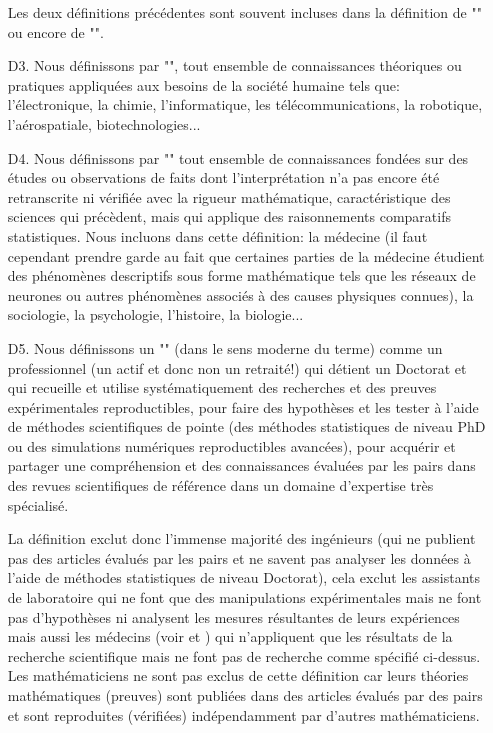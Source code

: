 \begin{itemize}
		\begin{tcolorbox}[title=Remarque,colframe=black,arc=10pt]
		Les deux d\'efinitions pr\'ec\'edentes sont souvent incluses dans la d\'efinition de "" ou encore de "".
		\end{tcolorbox}
		
		\item[D3.] Nous d\'efinissons par "", tout ensemble de connaissances th\'eoriques ou pratiques appliqu\'ees aux besoins de la soci\'et\'e humaine tels que: l'\'electronique, la chimie, l'informatique, les t\'el\'ecommunications, la robotique, l'a\'erospatiale, biotechnologies...
	
		\item[D4.] Nous d\'efinissons par "" tout ensemble de connaissances fond\'ees sur des \'etudes ou observations de faits dont l'interpr\'etation n'a pas encore \'et\'e retranscrite ni v\'erifi\'ee avec la rigueur math\'ematique, caract\'eristique des sciences qui pr\'ecèdent, mais qui applique des raisonnements comparatifs statistiques. Nous incluons dans cette d\'efinition: la m\'edecine (il faut cependant prendre garde au fait que certaines parties de la m\'edecine \'etudient des ph\'enomènes descriptifs sous forme math\'ematique tels que les r\'eseaux de neurones ou autres ph\'enomènes associ\'es à des causes physiques connues), la sociologie, la psychologie, l'histoire, la biologie...
		
		\item[D5.] Nous définissons un "" (dans le sens moderne du terme) comme un professionnel (un actif et donc non un retraité!) qui détient un Doctorat et qui recueille et utilise systématiquement des recherches et des preuves expérimentales reproductibles, pour faire des hypothèses et les tester à l'aide de méthodes scientifiques de pointe (des méthodes statistiques de niveau PhD ou des simulations numériques reproductibles avancées), pour acquérir et partager une compréhension et des connaissances évaluées par les pairs dans des revues scientifiques de référence dans un domaine d'expertise très spécialisé.

		La définition exclut donc l'immense majorité des ingénieurs (qui ne publient pas des articles évalués par les pairs et ne savent pas analyser les données à l'aide de méthodes statistiques de niveau Doctorat), cela exclut les assistants de laboratoire qui ne font que des manipulations expérimentales mais ne font pas d'hypothèses ni analysent les mesures résultantes de leurs expériences mais aussi les médecins (voir \cite{smith2004doctors} et \cite{freed2004doctors}) qui n'appliquent que les résultats de la recherche scientifique mais ne font pas de recherche comme spécifié ci-dessus. Les mathématiciens ne sont pas exclus de cette définition car leurs théories mathématiques (preuves) sont publiées dans des articles évalués par des pairs et sont reproduites (vérifiées) indépendamment par d'autres mathématiciens.
	

\end{itemize}
